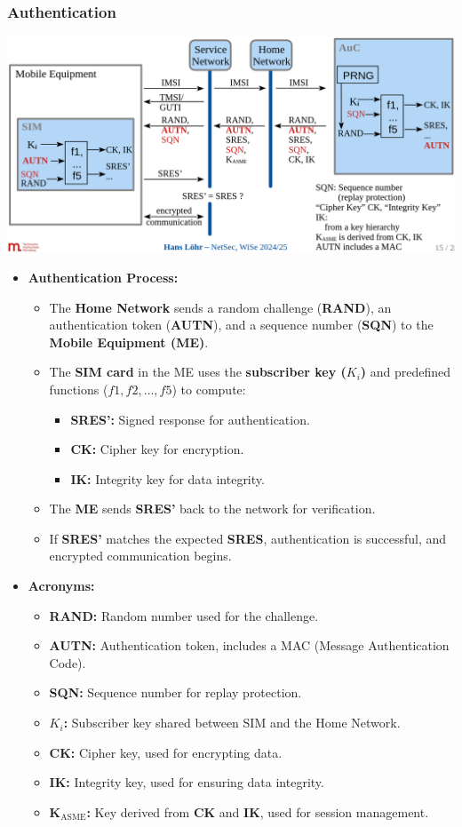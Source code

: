 \subsubsection{Authentication}
\includegraphics[width=0.8\columnwidth]{Resources/lte_auth.png} 
\begin{itemize}
    \item \textbf{Authentication Process:}
    \begin{itemize}
        \item The \textbf{Home Network} sends a random challenge (\textbf{RAND}), an authentication token (\textbf{AUTN}), and a sequence number (\textbf{SQN}) to the \textbf{Mobile Equipment (ME)}.
        \item The \textbf{SIM card} in the ME uses the \textbf{subscriber key (\(K_i\))} and predefined functions (\(f1, f2, \ldots, f5\)) to compute:
        \begin{itemize}
            \item \textbf{SRES':} Signed response for authentication.
            \item \textbf{CK:} Cipher key for encryption.
            \item \textbf{IK:} Integrity key for data integrity.
        \end{itemize}
        \item The \textbf{ME} sends \textbf{SRES'} back to the network for verification.
        \item If \textbf{SRES'} matches the expected \textbf{SRES}, authentication is successful, and encrypted communication begins.
    \end{itemize}

    \item \textbf{Acronyms:}
    \begin{itemize}
        \item \textbf{RAND:} Random number used for the challenge.
        \item \textbf{AUTN:} Authentication token, includes a MAC (Message Authentication Code).
        \item \textbf{SQN:} Sequence number for replay protection.
        \item \textbf{\(K_i\):} Subscriber key shared between SIM and the Home Network.
        \item \textbf{CK:} Cipher key, used for encrypting data.
        \item \textbf{IK:} Integrity key, used for ensuring data integrity.
        \item \textbf{K\(_{\text{ASME}}\):} Key derived from \textbf{CK} and \textbf{IK}, used for session management.
    \end{itemize}


\end{itemize}
